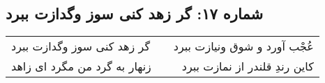 \begin{center}
\section*{شماره ۱۷: گر زهد کنی سوز وگدازت ببرد}
\label{sec:017}
\begin{longtable}{l p{0.5cm} r}
گر زهد کنی سوز وگدازت ببرد
&&
عُجْب آورد و شوق ونیازت ببرد
\\
زنهار به گرد من مگرد ای زاهد
&&
کاین رندِ قلندر از نمازت ببرد
\\
\end{longtable}
\end{center}
